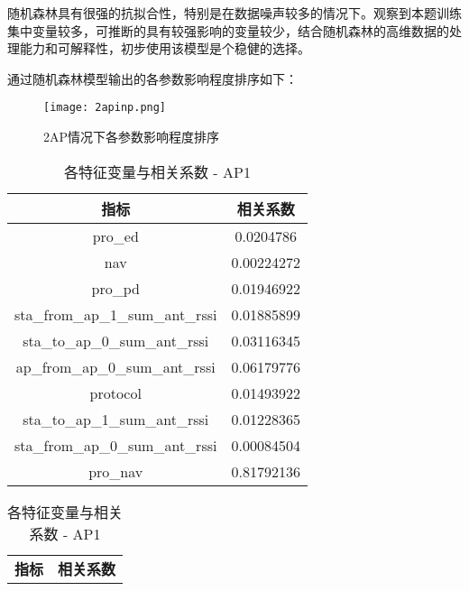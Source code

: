 \documentclass[bwprint]{gmcmthesis}
\begin{document}
随机森林具有很强的抗拟合性，特别是在数据噪声较多的情况下。观察到本题训练集中变量较多，可推断的具有较强影响的变量较少，结合随机森林的高维数据的处理能力和可解释性，初步使用该模型是个稳健的选择。
 
通过随机森林模型输出的各参数影响程度排序如下：

\begin{figure}[!htbp]
    \centering
    \texttt{[image: 2apinp.png]}
    \caption{\centering 2AP情况下各参数影响程度排序}
    \label{pho:2apinp}
\end{figure}

\begin{table}[htp!]
    \centering
    \begin{minipage}{0.45\textwidth}
        \centering
        \begin{tabular}{|c|c|}
            \hline
            \textbf{指标} & \textbf{相关系数} \\
            \hline
            pro\_ed & 0.0204786 \\
            \hline
            nav & 0.00224272 \\
            \hline
            pro\_pd & 0.01946922 \\
            \hline
            sta\_from\_ap\_1\_sum\_ant\_rssi & 0.01885899 \\
            \hline
            sta\_to\_ap\_0\_sum\_ant\_rssi & 0.03116345 \\
            \hline
            ap\_from\_ap\_0\_sum\_ant\_rssi & 0.06179776 \\
            \hline
            protocol & 0.01493922 \\
            \hline
            sta\_to\_ap\_1\_sum\_ant\_rssi & 0.01228365 \\
            \hline
            sta\_from\_ap\_0\_sum\_ant\_rssi & 0.00084504 \\
            \hline
            pro\_nav & 0.81792136 \\
            \hline
        \end{tabular}
        \caption{各特征变量与相关系数 - AP1}
        \label{tab:corresponding_values_ap1}
    \end{minipage}
    \hspace{0.05\textwidth} %
    \begin{minipage}{0.45\textwidth}
        \centering
        \begin{tabular}{|c|c|}
            \hline
            \textbf{指标} & \textbf{相关系数} \\

\end{tabular}
\end{minipage}
\end{table}
\end{document}
